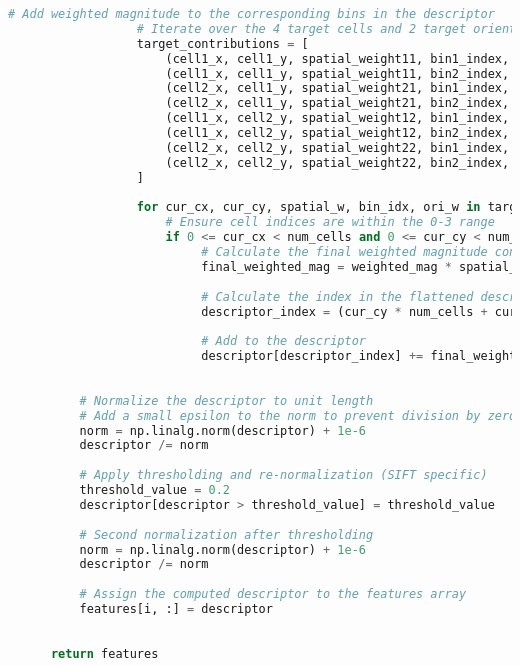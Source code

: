\begin{lstlisting}[caption={student.py}, label={lst:code-example}, captionpos=t, language=python]
                  # Add weighted magnitude to the corresponding bins in the descriptor
                  # Iterate over the 4 target cells and 2 target orientation bins
                  target_contributions = [
                      (cell1_x, cell1_y, spatial_weight11, bin1_index, ori_weight1),
                      (cell1_x, cell1_y, spatial_weight11, bin2_index, ori_weight2),
                      (cell2_x, cell1_y, spatial_weight21, bin1_index, ori_weight1),
                      (cell2_x, cell1_y, spatial_weight21, bin2_index, ori_weight2),
                      (cell1_x, cell2_y, spatial_weight12, bin1_index, ori_weight1),
                      (cell1_x, cell2_y, spatial_weight12, bin2_index, ori_weight2),
                      (cell2_x, cell2_y, spatial_weight22, bin1_index, ori_weight1),
                      (cell2_x, cell2_y, spatial_weight22, bin2_index, ori_weight2),
                  ]
  
                  for cur_cx, cur_cy, spatial_w, bin_idx, ori_w in target_contributions:
                      # Ensure cell indices are within the 0-3 range
                      if 0 <= cur_cx < num_cells and 0 <= cur_cy < num_cells:
                           # Calculate the final weighted magnitude contribution
                           final_weighted_mag = weighted_mag * spatial_w * ori_w
  
                           # Calculate the index in the flattened descriptor
                           descriptor_index = (cur_cy * num_cells + cur_cx) * num_bins + bin_idx
  
                           # Add to the descriptor
                           descriptor[descriptor_index] += final_weighted_mag
  
  
          # Normalize the descriptor to unit length
          # Add a small epsilon to the norm to prevent division by zero for uniform patches
          norm = np.linalg.norm(descriptor) + 1e-6
          descriptor /= norm
  
          # Apply thresholding and re-normalization (SIFT specific)
          threshold_value = 0.2
          descriptor[descriptor > threshold_value] = threshold_value
  
          # Second normalization after thresholding
          norm = np.linalg.norm(descriptor) + 1e-6
          descriptor /= norm
  
          # Assign the computed descriptor to the features array
          features[i, :] = descriptor
  
  
      return features
  

\end{lstlisting}
